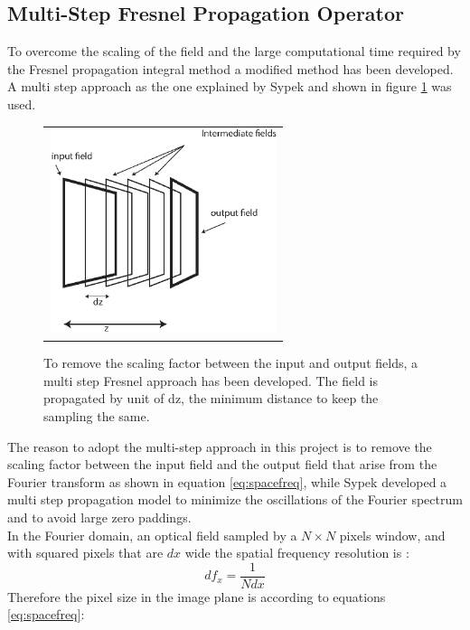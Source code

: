 \subsection{Multi-Step Fresnel Propagation Operator}
\label{sec:fresnelmulti}
To overcome the scaling of the field and the large computational time required by the Fresnel propagation integral method a modified method has been developed. 
A multi step approach as the one explained by Sypek \cite{sypek1995light, sypek2009reply} and shown in figure \ref{fig:multistepfig} was used. 
\begin{figure}[h]
	\begin{center}
		\begin{tabular}{c}
				\includegraphics[height=6cm]{multistepfig.eps}
		\end{tabular}
	\end{center}
	\caption{\label{fig:multistepfig} To remove the scaling factor between the input and output fields, a multi step Fresnel approach has been developed. The field is propagated by unit of dz, the minimum distance to keep the sampling the same. } 
	\end{figure}
The reason to adopt the multi-step approach in this project is to remove the scaling factor between the input field and the output field that arise from the Fourier transform as shown in equation \ref{eq:spacefreq}, while Sypek developed a multi step propagation model to minimize the oscillations of the Fourier spectrum and to avoid large zero paddings.\\ In the Fourier domain, an optical field sampled by a $N \times N$ pixels window, and with squared pixels that are $dx$ wide the spatial frequency resolution is \cite{bracewell1965fourier,gonzalez2004digital}:
\begin{equation}
\label{eq:getz1}
df_x=\dfrac{1}{Ndx}
\end{equation}
 Therefore the pixel size in the image plane is according to equations \ref{eq:spacefreq}:
